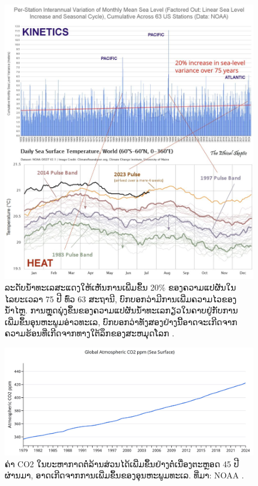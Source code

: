 \documentclass[10pt,twocolumn,letterpaper]{article}
\begin{document}
\begin{figure}[t]
\begin{center}
\includegraphics[width=1\textwidth]{sealevel.jpeg}
\end{center}
   \caption{ລະດັບນ້ໍາທະເລສະແດງໃຫ້ເຫັນການເພີ່ມຂຶ້ນ 20\% ຂອງຄວາມແປຜັນໃນໄລຍະເວລາ 75 ປີ ທົ່ວ 63 ສະຖານີ, ບົກບອກວ່າມີການເພີ່ມຄວາມໄວຂອງນໍ້າໄຫຼ. ການຫຼຸດພຸ່ງຂຶ້ນຂອງຄວາມແປຜັນນ້ໍາທະເລກຽວໃນຄາບຢູ່ກັບການເພີ່ມຂຶ້ນອຸນຫະພູມອ່າວທະເລ, ບົກບອກວ່າທັງສອງຢ່າງນີ້ອາດຈະເກີດຈາກຄວາມຮ້ອນທີ່ເກີດຈາກທາງໃຕ້ລຶກຂອງສະຫມຸດໂລກ \cite{2,129}.}
\label{fig:22}
\end{figure}

\begin{figure}[t]
\begin{center}
\includegraphics[width=1\textwidth]{co2.jpg}
\end{center}
   \caption{ຄ່າ CO2 ໃນບະຫາກາດຕໍ່ລ້ານສ່ວນໄດ້ເພີ່ມຂຶ້ນຢ່າງຕໍ່ເນື່ອງຕະຫຼອດ 45 ປີຜ່ານມາ, ອາດເກີດຈາກການເພີ່ມຂຶ້ນຂອງອຸນຫະພູມທະເລ. ທີ່ມາ: NOAA \cite{148,129}.}
\label{fig:23}
\end{figure}
\end{document}
